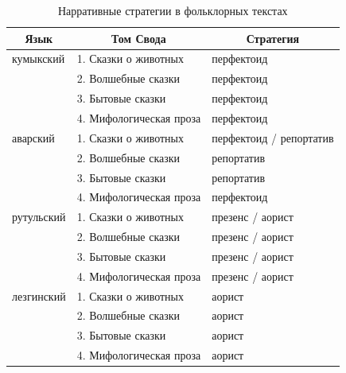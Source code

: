 \begin{table}[ht]
\caption{Нарративные стратегии в фольклорных текстах}
\centering
\label{tab:svod}
\vspace{0.5cm}
\begin{tabular}{lll}
\multicolumn{1}{c}{Язык}        & \multicolumn{1}{c}{Том Свода}                      & \multicolumn{1}{c}{Стратегия} \\ \hline
\multicolumn{1}{l|}{кумыкский}  & \multicolumn{1}{l|}{1. Сказки о животных}    & перфектоид                    \\
\multicolumn{1}{l|}{}           & \multicolumn{1}{l|}{2. Волшебные сказки}     & перфектоид                    \\
\multicolumn{1}{l|}{}           & \multicolumn{1}{l|}{3. Бытовые сказки}       & перфектоид                    \\
\multicolumn{1}{l|}{}           & \multicolumn{1}{l|}{4. Мифологическая проза} & перфектоид                    \\ \hline
\multicolumn{1}{l|}{аварский}   & \multicolumn{1}{l|}{1. Сказки о животных}    & перфектоид / репортатив       \\
\multicolumn{1}{l|}{}           & \multicolumn{1}{l|}{2. Волшебные сказки}     & репортатив                    \\
\multicolumn{1}{l|}{}           & \multicolumn{1}{l|}{3. Бытовые сказки}       & репортатив                    \\
\multicolumn{1}{l|}{}           & \multicolumn{1}{l|}{4. Мифологическая проза} & перфектоид                    \\ \hline
\multicolumn{1}{l|}{рутульский} & \multicolumn{1}{l|}{1. Сказки о животных}    & презенс / аорист            \\
\multicolumn{1}{l|}{}           & \multicolumn{1}{l|}{2. Волшебные сказки}     & презенс / аорист            \\
\multicolumn{1}{l|}{}           & \multicolumn{1}{l|}{3. Бытовые сказки}       & презенс / аорист            \\
\multicolumn{1}{l|}{}           & \multicolumn{1}{l|}{4. Мифологическая проза} & презенс / аорист            \\ \hline
\multicolumn{1}{l|}{лезгинский} & \multicolumn{1}{l|}{1. Сказки о животных}    & аорист                        \\
\multicolumn{1}{l|}{}           & \multicolumn{1}{l|}{2. Волшебные сказки}     & аорист                        \\
\multicolumn{1}{l|}{}           & \multicolumn{1}{l|}{3. Бытовые сказки}       & аорист                        \\
\multicolumn{1}{l|}{}           & \multicolumn{1}{l|}{4. Мифологическая проза} & аорист                       
\end{tabular}
\end{table}

